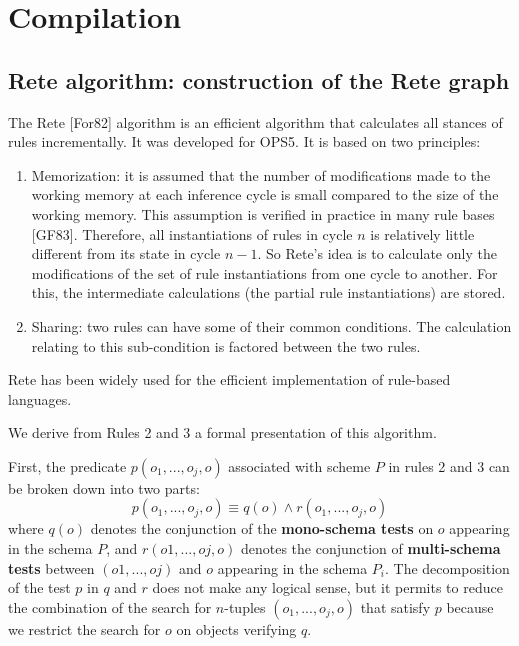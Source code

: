 \section{Compilation}

\subsection{Rete algorithm: construction of the Rete graph}

The Rete [For82] algorithm is an efficient algorithm that calculates all
stances of rules incrementally. It was developed for OPS5. It is based on two
principles:

\begin{enumerate}
	
	\item Memorization: it is assumed that the number of modifications made
	to the working memory at each inference cycle is small compared to the
	size of the working memory. This assumption is verified in practice in
	many rule bases [GF83].  Therefore, all instantiations
	of rules in cycle $n$ is relatively little different from its state in cycle $n - 1$.
	So Rete's idea is to calculate only the modifications of the set of
	rule instantiations from one cycle to another. For this, the intermediate calculations (the
	partial rule instantiations) are stored.  
	
	\item Sharing: two rules can have some of their common conditions.
	The calculation relating to this sub-condition is factored between the two rules.
	
\end{enumerate}

Rete has been widely used for the efficient implementation of rule-based languages.

We derive from Rules 2 and 3 a formal presentation of this algorithm.

First, the predicate $p(o_1, ..., o_j, o)$ associated with scheme $P$ in rules 2 and 3
can be broken down into two parts:
\begin{equation}
p(o_1, ..., o_j, o) \equiv q(o) \wedge r(o_1, ..., o_j, o)
\end{equation}
where $q(o)$ denotes the conjunction of the \textbf{mono-schema tests} on $o$ appearing in
the schema $P$, and $r(o1, ..., oj, o)$ denotes the conjunction of \textbf{multi-schema tests} between
$(o1, ..., oj)$ and $o$ appearing in the schema $P_i$.  The decomposition of the test $p$ in $q$
and $r$ does not make any logical sense, but it permits to reduce the combination of
the search for $n$-tuples $(o_1, ..., o_j, o)$ that satisfy $p$ because we restrict the search for $o$
on objects verifying $q$.

